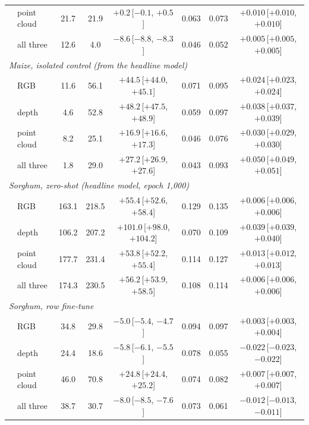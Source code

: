 \begin{table}[t]
\begin{tabular}{l l ccc ccc}
    & point cloud & 21.7 & 21.9 & $+0.2$\,{\tiny[$-0.1$, $+0.5$]} & 0.063 & 0.073 & $+0.010$\,{\tiny[$+0.010$, $+0.010$]} \\
    & all three   & 12.6 & 4.0 & $-8.6$\,{\tiny[$-8.8$, $-8.3$]} & 0.046 & 0.052 & $+0.005$\,{\tiny[$+0.005$, $+0.005$]} \\
    \midrule
    \multicolumn{8}{l}{\emph{Maize, isolated control (from the headline model)}} \\
    & RGB         & 11.6 & 56.1 & $+44.5$\,{\tiny[$+44.0$, $+45.1$]} & 0.071 & 0.095 & $+0.024$\,{\tiny[$+0.023$, $+0.024$]} \\
    & depth       & 4.6 & 52.8 & $+48.2$\,{\tiny[$+47.5$, $+48.9$]} & 0.059 & 0.097 & $+0.038$\,{\tiny[$+0.037$, $+0.039$]} \\
    & point cloud & 8.2 & 25.1 & $+16.9$\,{\tiny[$+16.6$, $+17.3$]} & 0.046 & 0.076 & $+0.030$\,{\tiny[$+0.029$, $+0.030$]} \\
    & all three   & 1.8 & 29.0 & $+27.2$\,{\tiny[$+26.9$, $+27.6$]} & 0.043 & 0.093 & $+0.050$\,{\tiny[$+0.049$, $+0.051$]} \\
    \midrule
    \multicolumn{8}{l}{\emph{Sorghum, zero-shot (headline model, epoch 1{,}000)}} \\
    & RGB         & 163.1 & 218.5 & $+55.4$\,{\tiny[$+52.6$, $+58.4$]} & 0.129 & 0.135 & $+0.006$\,{\tiny[$+0.006$, $+0.006$]} \\
    & depth       & 106.2 & 207.2 & $+101.0$\,{\tiny[$+98.0$, $+104.2$]} & 0.070 & 0.109 & $+0.039$\,{\tiny[$+0.039$, $+0.040$]} \\
    & point cloud & 177.7 & 231.4 & $+53.8$\,{\tiny[$+52.2$, $+55.4$]} & 0.114 & 0.127 & $+0.013$\,{\tiny[$+0.012$, $+0.013$]} \\
    & all three   & 174.3 & 230.5 & $+56.2$\,{\tiny[$+53.9$, $+58.5$]} & 0.108 & 0.114 & $+0.006$\,{\tiny[$+0.006$, $+0.006$]} \\
    \midrule
    \multicolumn{8}{l}{\emph{Sorghum, row fine-tune}} \\
    & RGB         & 34.8 & 29.8 & $-5.0$\,{\tiny[$-5.4$, $-4.7$]} & 0.094 & 0.097 & $+0.003$\,{\tiny[$+0.003$, $+0.004$]} \\
    & depth       & 24.4 & 18.6 & $-5.8$\,{\tiny[$-6.1$, $-5.5$]} & 0.078 & 0.055 & $-0.022$\,{\tiny[$-0.023$, $-0.022$]} \\
    & point cloud & 46.0 & 70.8 & $+24.8$\,{\tiny[$+24.4$, $+25.2$]} & 0.074 & 0.082 & $+0.007$\,{\tiny[$+0.007$, $+0.007$]} \\
    & all three   & 38.7 & 30.7 & $-8.0$\,{\tiny[$-8.5$, $-7.6$]} & 0.073 & 0.061 & $-0.012$\,{\tiny[$-0.013$, $-0.011$]} \\

\end{tabular}
\end{table}
